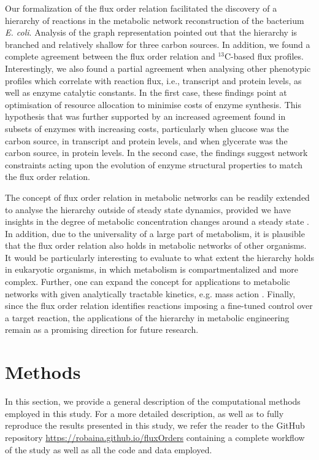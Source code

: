 \documentclass[12pt]{article}
\begin{document}
Our formalization of the flux order relation facilitated the discovery of a hierarchy of reactions in the metabolic network reconstruction of the bacterium \emph{E. coli}. Analysis of the graph representation pointed out that the hierarchy is branched and relatively shallow for three carbon sources. In addition, we found a complete agreement between the flux order relation and ${}^{13}\mathrm{C}$-based flux profiles.  Interestingly, we also found a partial agreement when analysing other phenotypic profiles which correlate with reaction flux, i.e., transcript and protein levels, as well as enzyme catalytic constants. In the first case, these findings point at optimisation of resource allocation to minimise costs of enzyme synthesis. This hypothesis that was further supported by an increased agreement found in subsets of enzymes with increasing costs, particularly when glucose was the carbon source, in transcript and protein levels, and when glycerate was the carbon source, in protein levels. In the second case, the findings suggest network constraints acting upon the evolution of enzyme structural properties to match the flux order relation.

The concept of flux order relation in metabolic networks can be readily extended to analyse the hierarchy outside of steady state dynamics, provided we have insights in the degree of metabolic concentration changes around a steady state \cite{Kleessen2015,Bordbar2017}. In addition, due to the universality of a large part of metabolism, it is plausible that the flux order relation also holds in metabolic networks of other organisms. It would be particularly interesting to evaluate to what extent the hierarchy holds in eukaryotic organisms, in which metabolism is compartmentalized and more complex. Further, one can expand the concept for applications to metabolic networks with given analytically tractable kinetics, e.g. mass action \cite{Kuken2019}. Finally, since the flux order relation identifies reactions imposing a fine-tuned control over a target reaction, the applications of the hierarchy in metabolic engineering remain as a promising direction for future research.

\section{Methods}
\label{section: Methods}
In this section, we provide a general description of the computational methods employed in this study. For a more detailed description, as well as to fully reproduce the results presented in this study, we refer the reader to the GitHub repository \url{https://robaina.github.io/fluxOrders} containing a complete workflow of the study as well as all the code and data employed.
\end{document}
